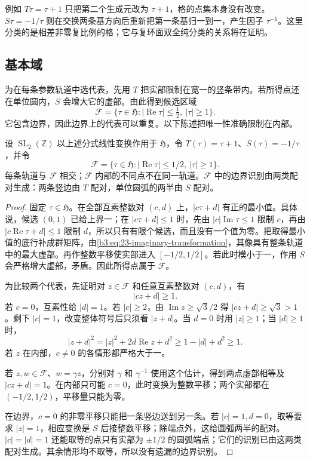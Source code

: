 例如 \(T\tau=\tau+1\) 只把第二个生成元改为 \(\tau+1\)，格的点集本身没有改变。\(S\tau=-1/\tau\) 则在交换两条基方向后重新把第一条基归一到一，产生因子 \(\tau^{-1}\)。这里分类的是相差非零复比例的格；它与复环面双全纯分类的关系将在证明。

\subsection{基本域}
\label{b3:subsec:230104}

为在每条参数轨道中选代表，先用 \(T\) 把实部限制在宽一的竖条带内。若所得点还在单位圆内，\(S\) 会增大它的虚部。由此得到候选区域
\[
 \mathcal F=\{\tau\in\mathfrak H:
           |\operatorname{Re}\tau|\le\tfrac12,\ |\tau|\ge1\}.
\]
它包含边界，因此边界上的代表可以重复。以下陈述把唯一性准确限制在内部。

\begin{proposition}\label{b3:prop:23-fundamental-domain}
设 \(\operatorname{SL}_2(\mathbb Z)\) 以上述分式线性变换作用于 \(\mathfrak H\)，令 \(T(\tau)=\tau+1\)、\(S(\tau)=-1/\tau\)，并令
\[
 \mathcal F=\{\tau\in\mathfrak H:
       |\operatorname{Re}\tau|\le1/2,\ |\tau|\ge1\}.
\]
每条轨道与 \(\mathcal F\) 相交；\(\mathcal F\) 内部的不同点不在同一轨道。\(\mathcal F\) 中的边界识别由两类配对生成：两条竖边由 \(T\) 配对，单位圆弧的两半由 \(S\) 配对。
\end{proposition}
\begin{proof}
固定 \(\tau\in\mathfrak H\)。在全部互素整数对 \((c,d)\) 上，\(|c\tau+d|\) 有正的最小值。具体说，候选 \((0,1)\) 已给上界一；在 \(|c\tau+d|\le1\) 时，先由 \(|c|\operatorname{Im}\tau\le1\) 限制 \(c\)，再由 \(|c\operatorname{Re}\tau+d|\le1\) 限制 \(d\)，所以只有有限个候选，而且没有一个值为零。把取得最小值的底行补成群矩阵，由\eqref{b3:eq:23-imaginary-transformation}，其像具有整条轨道中的最大虚部。再作整数平移使实部进入 \([-1/2,1/2]\)。若此时模小于一，作用 \(S\) 会严格增大虚部，矛盾。因此所得点属于 \(\mathcal F\)。

为比较两个代表，先证明对 \(z\in\mathcal F\) 和任意互素整数对 \((c,d)\)，有
\[
 |cz+d|\ge1.
\]
若 \(c=0\)，互素性给 \(|d|=1\)。若 \(|c|\ge2\)，由 \(\operatorname{Im}z\ge\sqrt3/2\) 得 \(|cz+d|\ge\sqrt3>1\)。剩下 \(|c|=1\)，改变整体符号后只须看 \(|z+d|\)。当 \(d=0\) 时用 \(|z|\ge1\)；当 \(|d|\ge1\) 时，
\[
 |z+d|^2=|z|^2+2d\operatorname{Re}z+d^2
 \ge1-|d|+d^2\ge1.
\]
若 \(z\) 在内部，\(c\ne0\) 的各情形都严格大于一。

若 \(z,w\in\mathcal F\)、\(w=\gamma z\)，分别对 \(\gamma\) 和 \(\gamma^{-1}\) 使用这个估计，得到两点虚部相等及 \(|cz+d|=1\)。在内部只可能 \(c=0\)，此时变换为整数平移；两个实部都在 \((-1/2,1/2)\)，平移量只能为零。

在边界，\(c=0\) 的非零平移只能把一条竖边送到另一条。若 \(|c|=1,d=0\)，取等要求 \(|z|=1\)，相应变换是 \(S\) 后接整数平移；除端点外，这给圆弧两半的配对。\(|c|=|d|=1\) 还能取等的点只有实部为 \(\pm1/2\) 的圆弧端点；它们的识别已由这两类配对生成。其余情形均不取等，所以没有遗漏的边界识别。
\end{proof}

